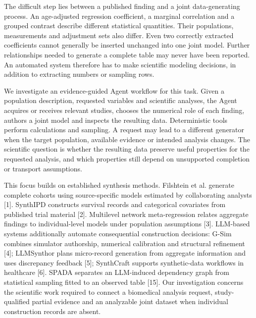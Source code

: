 \documentclass[10pt,twocolumn]{article}
\begin{document}
The difficult step lies between a published finding and a joint data-generating process. An age-adjusted regression coefficient, a marginal correlation and a grouped contrast describe different statistical quantities. Their populations, measurements and adjustment sets also differ. Even two correctly extracted coefficients cannot generally be inserted unchanged into one joint model. Further relationships needed to generate a complete table may never have been reported. An automated system therefore has to make scientific modeling decisions, in addition to extracting numbers or sampling rows.


We investigate an evidence-guided Agent workflow for this task. Given a population description, requested variables and scientific analyses, the Agent acquires or receives relevant studies, chooses the numerical role of each finding, authors a joint model and inspects the resulting data. Deterministic tools perform calculations and sampling. A request may lead to a different generator when the target population, available evidence or intended analysis changes. The scientific question is whether the resulting data preserve useful properties for the requested analysis, and which properties still depend on unsupported completion or transport assumptions.


This focus builds on established synthesis methods. Filshtein et al. generate complete cohorts using source-specific models estimated by collaborating analysts [1]. SynthIPD constructs survival records and categorical covariates from published trial material [2]. Multilevel network meta-regression relates aggregate findings to individual-level models under population assumptions [3]. LLM-based systems additionally automate consequential construction decisions: G-Sim combines simulator authorship, numerical calibration and structural refinement [4]; LLMSynthor plans micro-record generation from aggregate information and uses discrepancy feedback [5]; SynthCraft supports synthetic-data workflows in healthcare [6]. SPADA separates an LLM-induced dependency graph from statistical sampling fitted to an observed table [15]. Our investigation concerns the scientific work required to connect a biomedical analysis request, study-qualified partial evidence and an analyzable joint dataset when individual construction records are absent.
\end{document}
